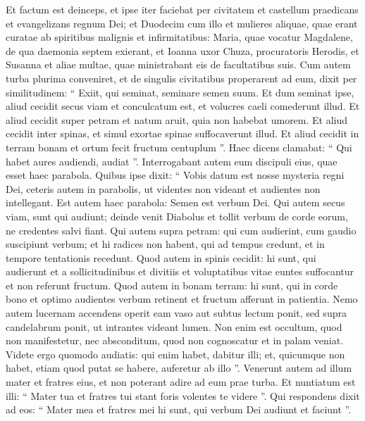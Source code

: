 \begin{biblechapter}
\begin{biblechapter}
\begin{biblechapter}
\begin{biblechapter}
\begin{biblechapter}
\begin{biblechapter}
\begin{biblechapter}
\begin{biblechapter}
\verse Et factum est deinceps, et ipse iter faciebat per civitatem et castellum praedicans et evangelizans regnum Dei; et Duodecim cum illo 
\verse et mulieres aliquae, quae erant curatae ab spiritibus malignis et infirmitatibus: Maria, quae vocatur Magdalene, de qua daemonia septem exierant, 
\verse et Ioanna uxor Chuza, procuratoris Herodis, et Susanna et aliae multae, quae ministrabant eis de facultatibus suis.
 \verse Cum autem turba plurima conveniret, et de singulis civitatibus properarent ad eum, dixit per similitudinem: 
\verse “ Exiit, qui seminat, seminare semen suum. Et dum seminat ipse, aliud cecidit secus viam et conculcatum est, et volucres caeli comederunt illud. 
\verse Et aliud cecidit super petram et natum aruit, quia non habebat umorem. 
\verse Et aliud cecidit inter spinas, et simul exortae spinae suffocaverunt illud. 
\verse Et aliud cecidit in terram bonam et ortum fecit fructum centuplum ”. Haec dicens clamabat: “ Qui habet aures audiendi, audiat ”.
 \verse Interrogabant autem eum discipuli eius, quae esset haec parabola. 
\verse Quibus ipse dixit: “ Vobis datum est nosse mysteria regni Dei, ceteris autem in parabolis, ut videntes non videant et audientes non intellegant.
 \verse Est autem haec parabola: Semen est verbum Dei. 
\verse Qui autem secus viam, sunt qui audiunt; deinde venit Diabolus et tollit verbum de corde eorum, ne credentes salvi fiant. 
\verse Qui autem supra petram: qui cum audierint, cum gaudio suscipiunt verbum; et hi radices non habent, qui ad tempus credunt, et in tempore tentationis recedunt. 
\verse Quod autem in spinis cecidit: hi sunt, qui audierunt et a sollicitudinibus et divitiis et voluptatibus vitae euntes suffocantur et non referunt fructum. 
\verse Quod autem in bonam terram: hi sunt, qui in corde bono et optimo audientes verbum retinent et fructum afferunt in patientia.
 \verse Nemo autem lucernam accendens operit eam vaso aut subtus lectum ponit, sed supra candelabrum ponit, ut intrantes videant lumen. 
\verse Non enim est occultum, quod non manifestetur, nec absconditum, quod non cognoscatur et in palam veniat. 
\verse Videte ergo quomodo audiatis: qui enim habet, dabitur illi; et, quicumque non habet, etiam quod putat se habere, auferetur ab illo ”.
 \verse Venerunt autem ad illum mater et fratres eius, et non poterant adire ad eum prae turba. 
\verse Et nuntiatum est illi: “ Mater tua et fratres tui stant foris volentes te videre ”. 
\verse Qui respondens dixit ad eos: “ Mater mea et fratres mei hi sunt, qui verbum Dei audiunt et faciunt ”.

\end{biblechapter}
\end{biblechapter}
\end{biblechapter}
\end{biblechapter}
\end{biblechapter}
\end{biblechapter}
\end{biblechapter}
\end{biblechapter}
